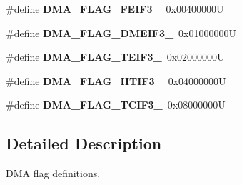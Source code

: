 \begin{DoxyCompactItemize}
\#define {\bfseries D\+M\+A\+\_\+\+F\+L\+A\+G\+\_\+\+F\+E\+I\+F3\+\_}~0x00400000U
\item 
\mbox{\label{group___d_m_a__flag__definitions_ga3053e2fb5ef245cf9c847c4de3fd1732}} 
\#define {\bfseries D\+M\+A\+\_\+\+F\+L\+A\+G\+\_\+\+D\+M\+E\+I\+F3\+\_}~0x01000000U
\item 
\mbox{\label{group___d_m_a__flag__definitions_ga7070307dcd59da45137962c521a06562}} 
\#define {\bfseries D\+M\+A\+\_\+\+F\+L\+A\+G\+\_\+\+T\+E\+I\+F3\+\_}~0x02000000U
\item 
\mbox{\label{group___d_m_a__flag__definitions_ga139d44f447ab2cf5c18311cf6b6ee6e2}} 
\#define {\bfseries D\+M\+A\+\_\+\+F\+L\+A\+G\+\_\+\+H\+T\+I\+F3\+\_}~0x04000000U
\item 
\mbox{\label{group___d_m_a__flag__definitions_ga4acf62e6807442dd5b611d95d1617b98}} 
\#define {\bfseries D\+M\+A\+\_\+\+F\+L\+A\+G\+\_\+\+T\+C\+I\+F3\+\_}~0x08000000U
\end{DoxyCompactItemize}


\subsection{Detailed Description}
D\+MA flag definitions. 

